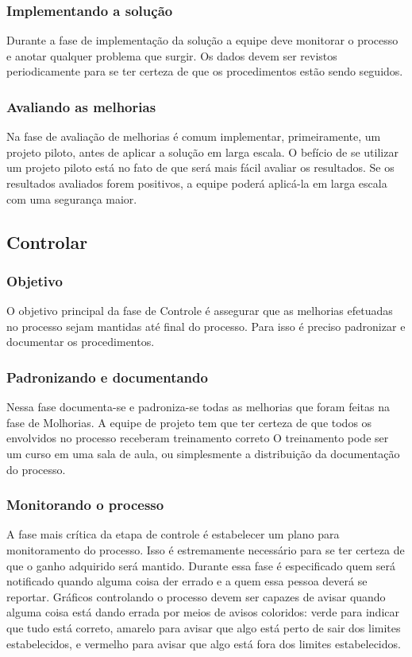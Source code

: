 \documentclass{abnt}
\begin{document}
					\subsubsection {Implementando a solução}
					Durante a fase de implementação da solução a equipe deve monitorar o processo e anotar qualquer problema que surgir.
					Os dados devem ser revistos periodicamente para se ter certeza de que os procedimentos estão sendo seguidos.
					\subsubsection {Avaliando as melhorias}
					Na fase de avaliação de melhorias é comum implementar, primeiramente, um projeto piloto, antes de aplicar a solução 
					em larga escala. O befício de se utilizar um projeto piloto está no fato de que será mais fácil avaliar os resultados. 
					Se os resultados avaliados forem positivos, a equipe poderá aplicá-la em larga escala com uma segurança maior.
				\subsection {Controlar}
					\subsubsection {Objetivo}
					O objetivo principal da fase de Controle é assegurar que as melhorias efetuadas no processo sejam 
					mantidas até final do processo. Para isso é preciso padronizar e documentar os procedimentos.
					\subsubsection {Padronizando e documentando}
					Nessa fase documenta-se e padroniza-se todas as melhorias que foram feitas na fase de Molhorias.
					A equipe de projeto tem que ter certeza de que todos os envolvidos no processo receberam treinamento correto 
					O treinamento pode ser um curso em uma sala de aula, ou simplesmente a distribuição da documentação do processo.
					\subsubsection {Monitorando o processo}
					A fase mais crítica da etapa de controle é estabelecer um plano para monitoramento do processo. Isso é estremamente 
					necessário para se ter certeza de que o ganho adquirido será mantido. Durante essa fase é especificado quem será 
					notificado quando alguma coisa der errado e a quem essa pessoa deverá se reportar.
					Gráficos controlando o processo devem ser capazes de avisar quando alguma coisa está dando errada por meios de 
					avisos coloridos: verde para indicar que tudo está correto, amarelo para avisar que algo está perto de sair dos limites estabelecidos, 
					e vermelho para avisar que algo está fora dos limites estabelecidos.
\end{document}
